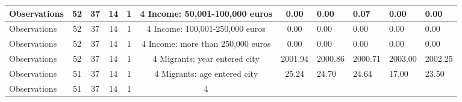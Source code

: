 \begin{tabular}{l c c c c c c }
\midrule
Observations &        52 &        37 &        14 &         1 &         4
Income: 50,001-100,000 euros &      0.00 &      0.00 &      0.07 &      0.00 &      0.00 \\
\midrule
Observations &        52 &        37 &        14 &         1 &         4
Income: 100,001-250,000 euros &      0.00 &      0.00 &      0.00 &      0.00 &      0.00 \\
\midrule
Observations &        52 &        37 &        14 &         1 &         4
Income: more than 250,000 euros &      0.00 &      0.00 &      0.00 &      0.00 &      0.00 \\
\midrule
Observations &        52 &        37 &        14 &         1 &         4
Migrants: year entered city &   2001.94 &   2000.86 &   2000.71 &   2003.00 &   2002.25 \\
\midrule
Observations &        51 &        37 &        14 &         1 &         4
Migrants: age entered city &     25.24 &     24.70 &     24.64 &     17.00 &     23.50 \\
\midrule
Observations &        51 &        37 &        14 &         1 &         4
\bottomrule
\end{tabular}
